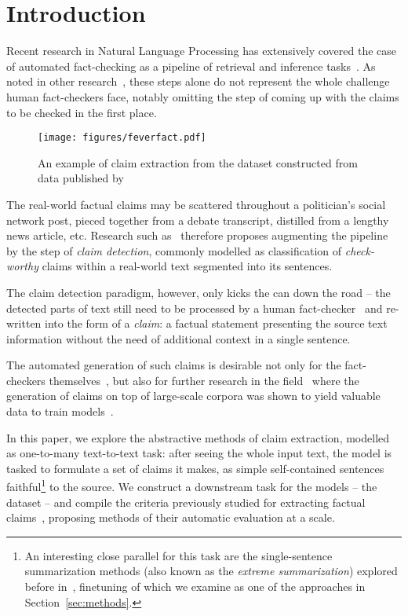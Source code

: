 \section{Introduction}\label{sec:intro}

Recent research in Natural Language Processing has extensively covered the case of automated fact-checking as a pipeline of retrieval and inference tasks~\cite{fever-2022-fact,thorne-vlachos-2021-evidence}.
As noted in other research~\cite{guo-etal-2022-survey}, these steps alone do not represent the whole challenge human fact-checkers face, notably omitting the step of coming up with the claims to be checked in the first place.
\begin{figure}[h]
    \centering
    \texttt{[image: figures/feverfact.pdf]}
    \caption[An example from \ds{} dataset]{An example of claim extraction from the \ds{} dataset constructed from data published by~\citealt{thorne-vlachos-2021-evidence}}
    \label{fig:feverfact}
\end{figure}


The real-world factual claims may be scattered throughout a politician's social network post, pieced together from a debate transcript, distilled from a lengthy news article, etc. 
Research such as~\cite{barroncedeno2020overview} therefore proposes augmenting the pipeline by the step of \textit{claim detection}, commonly modelled as classification of \textit{check-worthy} claims within a real-world text segmented into its sentences.

The claim detection paradigm, however, only kicks the can down the road -- the detected  parts of text still need to be processed by a human fact-checker~\cite{sheikhi-etal-2023-automated} and re-written into the form of a \textit{claim}: a factual statement presenting the source text information without the need of additional context in a single sentence.

The automated generation of such claims is desirable not only for the fact-checkers themselves~\cite{deng-etal-2024-document}, but also for further research in the field~\cite{drchal2023pipeline} where the generation of claims on top of large-scale corpora was shown to yield valuable data to train models~\cite{pan-etal-2021-zero}.

In this paper, we explore the abstractive methods of claim extraction, modelled as one-to-many text-to-text task: after seeing the whole input text, the model is tasked to formulate a set of claims it makes, as simple self-contained sentences faithful\footnote{An interesting close parallel for this task are the single-sentence summarization methods (also known as the \textit{extreme summarization}) explored before in~\citealt{narayan-etal-2018-dont,mao-etal-2022-citesum}, finetuning of which we examine as one of the approaches in Section~\ref{sec:methods}.} to the source. 
We construct a downstream task for the models -- the \textbf{\ds} dataset -- and compile the criteria previously studied for extracting factual claims~\cite{wright-etal-2022-generating,10.1007/978-3-031-28241-6_59}, proposing methods of their automatic evaluation at a scale.

